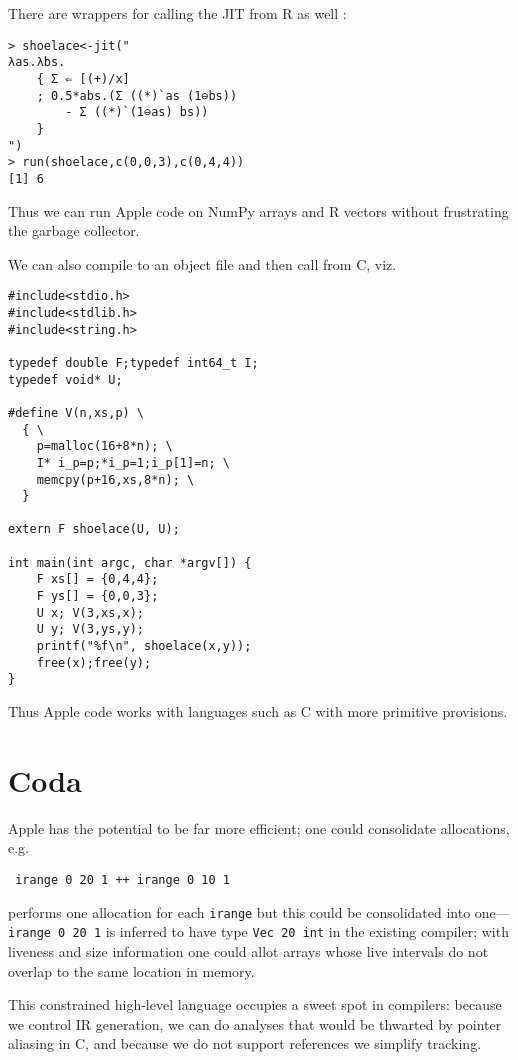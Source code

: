 \documentclass[sigplan,screen,anonymous]{acmart}
\begin{document}
There are wrappers for calling the JIT from R as well \cite{wickham}:

\begin{verbatim}
> shoelace<-jit("
λas.λbs.
    { Σ ⇐ [(+)/x]
    ; 0.5*abs.(Σ ((*)`as (1⊖bs))
        - Σ ((*)`(1⊖as) bs))
    }
")
> run(shoelace,c(0,0,3),c(0,4,4))
[1] 6
\end{verbatim}

Thus we can run Apple code on NumPy arrays and R vectors without frustrating the garbage collector.

We can also compile to an object file and then call from C, viz.

\begin{verbatim}
#include<stdio.h>
#include<stdlib.h>
#include<string.h>

typedef double F;typedef int64_t I;
typedef void* U;

#define V(n,xs,p) \
  { \
    p=malloc(16+8*n); \
    I* i_p=p;*i_p=1;i_p[1]=n; \
    memcpy(p+16,xs,8*n); \
  }

extern F shoelace(U, U);

int main(int argc, char *argv[]) {
    F xs[] = {0,4,4};
    F ys[] = {0,0,3};
    U x; V(3,xs,x);
    U y; V(3,ys,y);
    printf("%f\n", shoelace(x,y));
    free(x);free(y);
}
\end{verbatim}

Thus Apple code works with languages such as C with more primitive provisions.

\section{Coda}

Apple has the potential to be far more efficient; one could consolidate allocations, e.g.

\begin{verbatim}
 irange 0 20 1 ++ irange 0 10 1
\end{verbatim}
performs one allocation for each {\tt irange} but this could be consolidated into one---{\tt irange 0 20 1} is inferred to have type {\tt Vec 20 int} in the existing compiler; with liveness and size information one could allot arrays whose live intervals do not overlap to the same location in memory.

This constrained high-level language occupies a sweet spot in compilers: because we control IR generation, we can do analyses that would be thwarted by pointer aliasing in C, and because we do not support references we simplify tracking.



\end{document}
